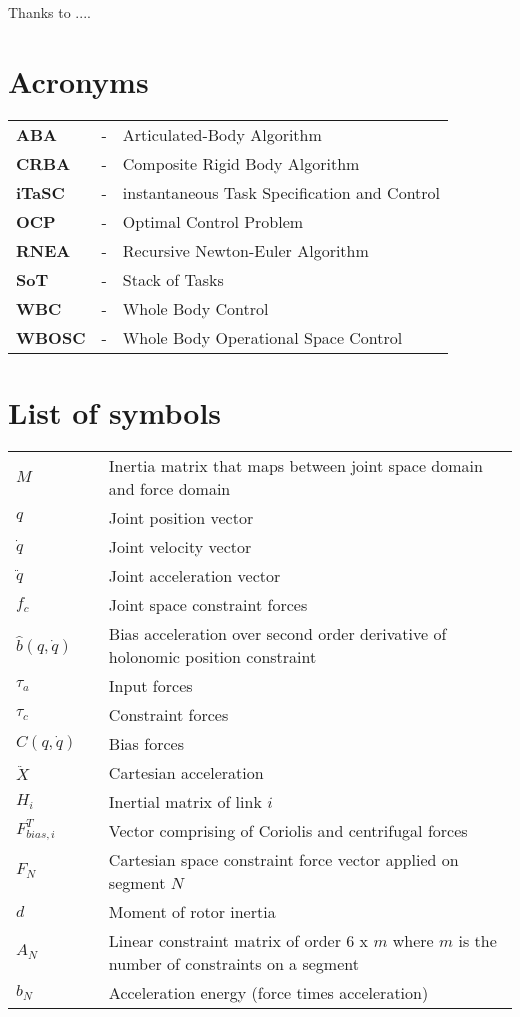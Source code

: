 \documentclass[rnd]{mas_report}
\newcommand\nomenclature[3]{#1 & #2 & #3 \\}
\begin{document}
	
	\begin{acknowledgements}
		Thanks to ....
	\end{acknowledgements}
	
	
	{\hypersetup{hidelinks}
			\tableofcontents
	}
	\listoffigures
	\listoftables

	\newpage
	\chapter*{Acronyms}
	\begin{longtable}{@{}p{2.5cm}@{}p{1cm}@{}p{\dimexpr\textwidth-1cm\relax}@{}}
		\label{aba}\nomenclature{\textbf{ABA}}{-}{Articulated-Body Algorithm }%
		\label{crba}\nomenclature{\textbf{CRBA}}{-}{Composite Rigid Body Algorithm}%
		\label{itasc}\nomenclature{\textbf{iTaSC}}{-}{instantaneous Task Specification and Control}%
		\label{ocp}\nomenclature{\textbf{OCP}}{-}{Optimal Control Problem}%
		\label{rnea}\nomenclature{\textbf{RNEA}}{-}{Recursive Newton-Euler Algorithm}%
		\label{sot}\nomenclature{\textbf{SoT}}{-}{Stack of Tasks}%
		\label{wbc}\nomenclature{\textbf{WBC}}{-}{Whole Body Control}%
		\label{wbosc}\nomenclature{\textbf{WBOSC}}{-}{Whole Body Operational Space Control}%
		
		
		
	\end{longtable}
	
	\newpage
	\chapter*{List of symbols}
	\begin{longtable}{@{}p{1.8cm}@{}p{1cm}@{}p{\dimexpr\textwidth-1cm\relax}@{}}
		\nomenclature{$M$}{}{Inertia matrix that maps between joint space domain and force domain \setstretch{1.5}} 
		\nomenclature{$q$}{}{Joint position vector}
		\nomenclature{$\dot{q}$}{}{Joint velocity vector}
		\nomenclature{$\ddot{q}$}{}{Joint acceleration vector}
		\nomenclature{$f_c$}{}{Joint space constraint forces}
		\nomenclature{$\hat{b}(q, \dot{q})$}{}{Bias acceleration over second order derivative of holonomic position constraint}
		\nomenclature{$\tau_a$}{}{Input forces}
		\nomenclature{$\tau_c$}{}{Constraint forces}
		\nomenclature{$C(q, \dot{q})$}{}{Bias forces}
		\nomenclature{$\ddot{X}$}{}{Cartesian acceleration}
		\nomenclature{$H_i$}{}{Inertial matrix of link $i$}
		\nomenclature{$F_{bias, i}^T$}{}{Vector comprising of Coriolis and centrifugal forces}
		\nomenclature{$F_N$}{}{Cartesian space constraint force vector applied on segment $N$}
		\nomenclature{$d$}{}{Moment of rotor inertia}
		\nomenclature{$A_N$}{}{Linear constraint matrix of order 6 x $m$ where $m$ is the number of constraints on a segment}
		\nomenclature{$b_N$}{}{Acceleration energy (force times acceleration)}	
	\end{longtable}
	
\end{document}
